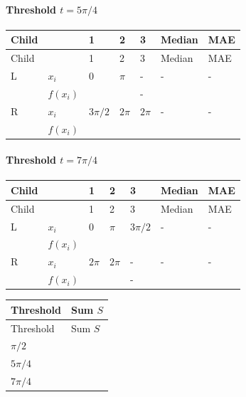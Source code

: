 \documentclass[10pt]{article}
\begin{document}
\paragraph*{Threshold $t=5\pi/4$}
\begingroup
\small
\setlength{\tabcolsep}{4pt}
\begin{longtable}{l|l|l|l|l|l|l}
Child &  & 1 & 2 & 3 & Median & MAE \\
\hline
\endfirsthead
Child &  & 1 & 2 & 3 & Median & MAE \\
\hline
\endhead
L & $x_i$ & $0$ & $\pi$ & - & - & - \\[3pt]
 & $f(x_i)$ & $\phantom{0}$ & $\phantom{0}$ & - & $\phantom{0}$ & $\phantom{0}$ \\[3pt]
R & $x_i$ & $3\pi/2$ & $2\pi$ & $2\pi$ & - & - \\[3pt]
 & $f(x_i)$ & $\phantom{0}$ & $\phantom{0}$ & $\phantom{0}$ & $\phantom{0}$ & $\phantom{0}$ \\[3pt]
\end{longtable}
\endgroup
\paragraph*{Threshold $t=7\pi/4$}
\begingroup
\small
\setlength{\tabcolsep}{4pt}
\begin{longtable}{l|l|l|l|l|l|l}
Child &  & 1 & 2 & 3 & Median & MAE \\
\hline
\endfirsthead
Child &  & 1 & 2 & 3 & Median & MAE \\
\hline
\endhead
L & $x_i$ & $0$ & $\pi$ & $3\pi/2$ & - & - \\[3pt]
 & $f(x_i)$ & $\phantom{0}$ & $\phantom{0}$ & $\phantom{0}$ & $\phantom{0}$ & $\phantom{0}$ \\[3pt]
R & $x_i$ & $2\pi$ & $2\pi$ & - & - & - \\[3pt]
 & $f(x_i)$ & $\phantom{0}$ & $\phantom{0}$ & - & $\phantom{0}$ & $\phantom{0}$ \\[3pt]
\end{longtable}
\endgroup
\begingroup
\small
\setlength{\tabcolsep}{4pt}
\begin{longtable}{l|l}
Threshold & Sum $S$ \\
\hline
\endfirsthead
Threshold & Sum $S$ \\
\hline
\endhead
$\pi/2$ & $\phantom{0}$ \\[3pt]
$5\pi/4$ & $\phantom{0}$ \\[3pt]
$7\pi/4$ & $\phantom{0}$ \\[3pt]
\end{longtable}
\endgroup
\end{document}
